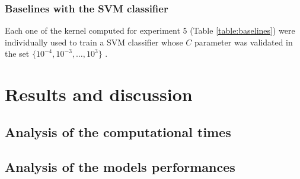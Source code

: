 \subsubsection{Baselines with the SVM classifier}

Each one of the kernel computed for experiment 5 (Table \ref{table:baselines}) were
individually used to train a SVM classifier whose $C$ parameter was validated
in the set $\{10^{-4},10^{-3},\dots,10^3\}$ \cite{rtesselli}.


\section{Results and discussion}
\label{subsec:results}

\subsection{Analysis of the computational times}

\subsection{Analysis of the models performances}

